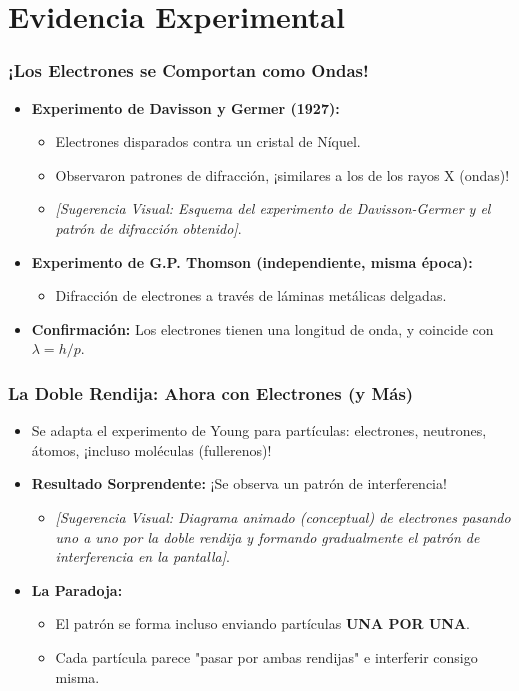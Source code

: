 \documentclass{beamer}
\begin{document}
	\section{Evidencia Experimental}
	
	\begin{frame}
		\frametitle{¡Los Electrones se Comportan como Ondas!}
		\begin{itemize}
			\item \textbf{Experimento de Davisson y Germer (1927):}
			\begin{itemize}
				\item Electrones disparados contra un cristal de Níquel.
				\item Observaron patrones de difracción, ¡similares a los de los rayos X (ondas)!
				\item \textit{[Sugerencia Visual: Esquema del experimento de Davisson-Germer y el patrón de difracción obtenido]}.
			\end{itemize} \pause
			\item \textbf{Experimento de G.P. Thomson (independiente, misma época):}
			\begin{itemize}
				\item Difracción de electrones a través de láminas metálicas delgadas.
			\end{itemize} \pause
			\item \textbf{Confirmación:} Los electrones tienen una longitud de onda, y coincide con $\lambda = h/p$.
		\end{itemize}
	\end{frame}
	
	\begin{frame}
		\frametitle{La Doble Rendija: Ahora con Electrones (y Más)}
		\begin{itemize}
			\item Se adapta el experimento de Young para partículas: electrones, neutrones, átomos, ¡incluso moléculas (fullerenos)! \pause
			\item \textbf{Resultado Sorprendente:} ¡Se observa un patrón de interferencia!
			\begin{itemize}
				\item \textit{[Sugerencia Visual: Diagrama animado (conceptual) de electrones pasando uno a uno por la doble rendija y formando gradualmente el patrón de interferencia en la pantalla]}.
			\end{itemize} \pause
			\item \textbf{La Paradoja:}
			\begin{itemize}
				\item El patrón se forma incluso enviando partículas \textbf{UNA POR UNA}.
				\item Cada partícula parece "pasar por ambas rendijas" e interferir consigo misma.
			\end{itemize}
		\end{itemize}
	\end{frame}
	
\end{document}
